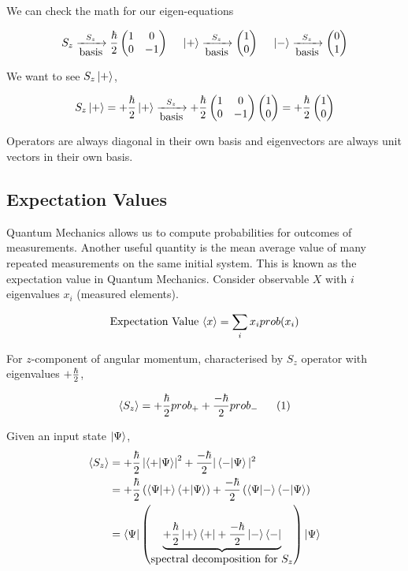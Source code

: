 \documentclass[english, 11pt]{article}
\begin{document}
      We can check the math for our eigen-equations

      \[ S_z \xrightarrow[\mbox{basis}]{S_z} \frac{\hbar}{2}\left(\begin{matrix}1 & 0 \\ 0 & -1\end{matrix}\right) \ \ \ \ \left|+\right\rangle \xrightarrow[\mbox{basis}]{S_z} \left(\begin{matrix}1 \\ 0\end{matrix}\right) \ \ \ \ \left|-\right\rangle \xrightarrow[\mbox{basis}]{S_z} \left(\begin{matrix}0 \\ 1\end{matrix}\right) \]

      We want to see $S_z\left|+\right\rangle$,

      \[ S_z\left|+\right\rangle = +\frac{\hbar}{2} \left|+\right\rangle\xrightarrow[\mbox{basis}]{S_z} +\frac{\hbar}{2}\left(\begin{matrix}1 & 0 \\ 0 & -1\end{matrix}\right)\left(\begin{matrix}1 \\ 0\end{matrix}\right) = +\frac{\hbar}{2}\left(\begin{matrix}1\\0\end{matrix}\right) \]

      \begin{note}
        Operators are always diagonal in their own basis and eigenvectors are always unit vectors in their own basis.
      \end{note}

    \subsection{Expectation Values}

      Quantum Mechanics allows us to compute probabilities for outcomes of measurements. Another useful quantity is the mean average value of many repeated measurements on the same initial system. This is known as the expectation value in Quantum Mechanics. Consider observable $X$ with $i$ eigenvalues $x_i$ (measured elements).

      \[ \mbox{Expectation Value } \langle x \rangle = \sum_i x_i prob(x_i) \]

      For $z$-component of angular momentum, characterised by $S_z$ operator with eigenvalues $+\frac{\hbar}{2}$,

      \[ \langle S_z \rangle = +\frac{\hbar}{2}prob_+ + \frac{-\hbar}{2}prob_- \ \ \ \ \ (1) \]

      Given an input state $\left|\Psi\right\rangle$,
      \begin{align*}
        \E{S_z} & = +\f{\hbar}{2} \left| \braket{+}{\Psi} \right|^2 + \f{-\hbar}{2} |\braket{-}{\Psi}|^2 \\
        & = +\f{\hbar}{2} \left( \braket{\Psi}{+}\braket{+}{\Psi} \right) + \f{-\hbar}{2} \left( \braket{\Psi}{-}\braket{-}{\Psi} \right) \\
        & = \bra{\Psi} \left( \underbrace{+\f{\hbar}{2} \ket{+}\bra{+} + \f{-\hbar}{2}\ket{-}\bra{-}}_{\mbox{spectral decomposition for $S_z$}} \right) \ket{\Psi}
      \end{align*}
\end{document}
